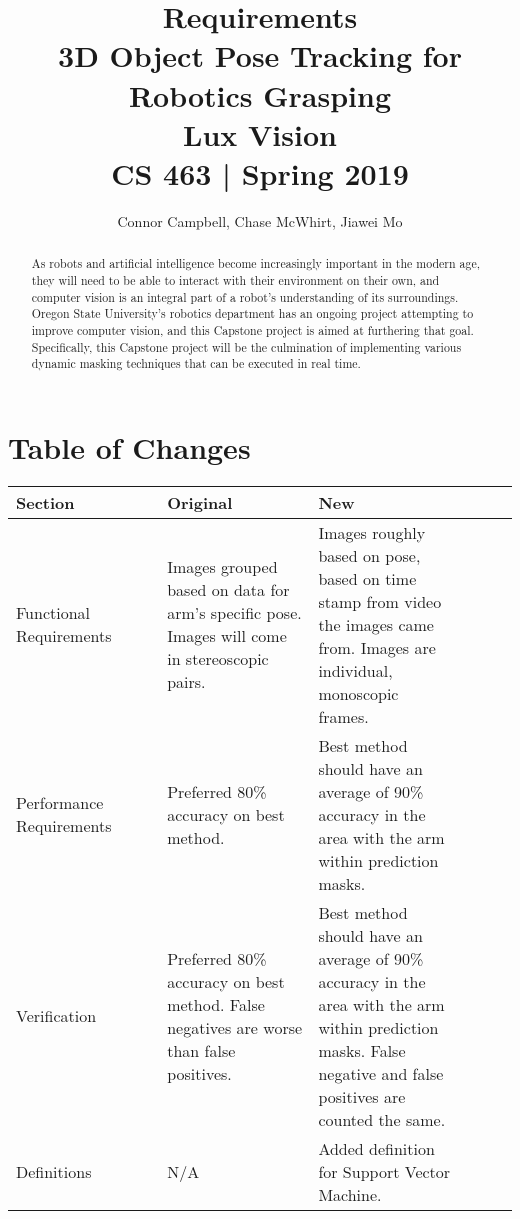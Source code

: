 \documentclass[10pt,journal,compsoc, draftclsnofoot,onecolumn]{IEEEtran}
\title{
    Requirements
    \\3D Object Pose Tracking for Robotics Grasping
    \\Lux Vision
    \\CS 463 | Spring 2019
}
\author{Connor Campbell, Chase McWhirt, Jiawei Mo}
\begin{document}
\maketitle

\begin{abstract}
As robots and artificial intelligence become increasingly important in the modern age, they will need to be able to interact with their environment on their own, and computer vision is an integral part of a robot's understanding of its surroundings.
Oregon State University's robotics department has an ongoing project attempting to improve computer vision, and this Capstone project is aimed at furthering that goal.
Specifically, this Capstone project will be the culmination of implementing various dynamic masking techniques that can be executed in real time.
\end{abstract}
\pagebreak


\tableofcontents
\pagebreak

\section{Table of Changes}
\begin{center}
 \begin{tabular}{|p{0.3\linewidth}|p{0.3\linewidth}|p{0.3\linewidth}|p{0.2\linewidth}|}
  \hline
Section & Original & New \\ [0.5ex]
 \hline\hline


Functional Requirements
&
Images grouped based on data for arm's specific pose.
Images will come in stereoscopic pairs.
&
Images roughly based on pose, based on time stamp from video the images came from.
Images are individual, monoscopic frames.
\\ \hline


Performance Requirements
&
Preferred 80\% accuracy on best method.
&
Best method should have an average of 90\% accuracy in the area with the arm within prediction masks.
\\ \hline


Verification
&
Preferred 80\% accuracy on best method.
False negatives are worse than false positives.
&
Best method should have an average of 90\% accuracy in the area with the arm within prediction masks.
False negative and false positives are counted the same.
\\ \hline


Definitions
&
N/A
&
Added definition for Support Vector Machine.
\\ \hline

 
 
 \end{tabular}
\end{center}
\pagebreak
\end{document}
